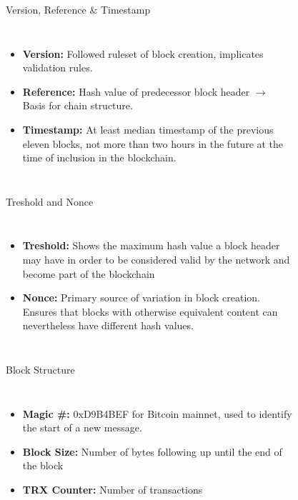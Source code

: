 \documentclass[]{beamer}
\begin{document}
\begin{frame}{Version, Reference \& Timestamp}
	\begin{columns}
		\begin{itemize}
			\item \textbf{Version:} Followed ruleset of block creation, implicates validation rules.
			\item \textbf{Reference:} Hash value of predecessor block header $\rightarrow$ Basis for chain structure.
			\item \textbf{Timestamp:} At least median timestamp of the previous eleven blocks, not more than two hours in the future at the time of inclusion in the blockchain. 
		\end{itemize}
		\begin{figure}
			
		\end{figure}
	\end{columns}
\end{frame}


\begin{frame}{Treshold and Nonce}
	\begin{columns}
	\column{0.7\textwidth}
		\begin{itemize}
			\item \textbf{Treshold:} Shows the maximum hash value a block header may have in order to be considered valid by the network and become part of the blockchain
			\item \textbf{Nonce:} Primary source of variation in block creation. Ensures that blocks with otherwise equivalent content can nevertheless have different hash values.
		\end{itemize}
	\column{0.3\textwidth}
		\begin{figure}
			
		\end{figure}
	\end{columns}
\end{frame}


\begin{frame}{Block Structure}
	\begin{columns}
	\column{0.5\textwidth}
		\begin{itemize}
			\item \textbf{Magic \#:} 0xD9B4BEF for Bitcoin mainnet, used to identify the start of a new message.
			\item \textbf{Block Size:} Number of bytes following up until the end of the block
			\item \textbf{TRX Counter:} Number of transactions
		\end{itemize}
	\column{0.5\textwidth}
		\begin{figure}
			\begin{tikzpicture}[domain=-8:8,scale=1.2, every node/.style={scale=1.2}]
  				
  			\end{tikzpicture}
			\end{figure}
	\end{columns}
\end{frame}
\end{document}
